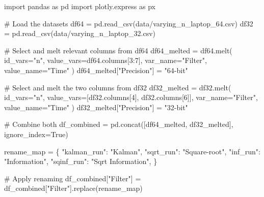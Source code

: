 \documentclass[
]{report}
\newenvironment{Shaded}{\begin{snugshade}}{\end{snugshade}}
\newcommand{\CommentTok}[1]{\textcolor[rgb]{0.37,0.37,0.37}{#1}}
\newcommand{\DecValTok}[1]{\textcolor[rgb]{0.68,0.00,0.00}{#1}}
\newcommand{\ImportTok}[1]{\textcolor[rgb]{0.00,0.46,0.62}{#1}}
\newcommand{\NormalTok}[1]{\textcolor[rgb]{0.00,0.23,0.31}{#1}}
\newcommand{\OperatorTok}[1]{\textcolor[rgb]{0.37,0.37,0.37}{#1}}
\newcommand{\StringTok}[1]{\textcolor[rgb]{0.13,0.47,0.30}{#1}}
\newcommand{\VariableTok}[1]{\textcolor[rgb]{0.07,0.07,0.07}{#1}}
\begin{document}
\begin{Shaded}
\begin{Highlighting}[]
\ImportTok{import}\NormalTok{ pandas }\ImportTok{as}\NormalTok{ pd}
\ImportTok{import}\NormalTok{ plotly.express }\ImportTok{as}\NormalTok{ px}

\CommentTok{\# Load the datasets}
\NormalTok{df64 }\OperatorTok{=}\NormalTok{ pd.read\_csv(}\StringTok{\textquotesingle{}data/varying\_n\_laptop\_64.csv\textquotesingle{}}\NormalTok{)}
\NormalTok{df32 }\OperatorTok{=}\NormalTok{ pd.read\_csv(}\StringTok{\textquotesingle{}data/varying\_n\_laptop\_32.csv\textquotesingle{}}\NormalTok{)}

\CommentTok{\# Select and melt relevant columns from df64}
\NormalTok{df64\_melted }\OperatorTok{=}\NormalTok{ df64.melt(}
\NormalTok{    id\_vars}\OperatorTok{=}\StringTok{"n"}\NormalTok{, }
\NormalTok{    value\_vars}\OperatorTok{=}\NormalTok{df64.columns[}\DecValTok{3}\NormalTok{:}\DecValTok{7}\NormalTok{],}
\NormalTok{    var\_name}\OperatorTok{=}\StringTok{"Filter"}\NormalTok{,}
\NormalTok{    value\_name}\OperatorTok{=}\StringTok{"Time"}
\NormalTok{)}
\NormalTok{df64\_melted[}\StringTok{"Precision"}\NormalTok{] }\OperatorTok{=} \StringTok{"64{-}bit"}

\CommentTok{\# Select and melt the two columns from df32}
\NormalTok{df32\_melted }\OperatorTok{=}\NormalTok{ df32.melt(}
\NormalTok{    id\_vars}\OperatorTok{=}\StringTok{"n"}\NormalTok{,}
\NormalTok{    value\_vars}\OperatorTok{=}\NormalTok{[df32.columns[}\DecValTok{4}\NormalTok{], df32.columns[}\DecValTok{6}\NormalTok{]],}
\NormalTok{    var\_name}\OperatorTok{=}\StringTok{"Filter"}\NormalTok{,}
\NormalTok{    value\_name}\OperatorTok{=}\StringTok{"Time"}
\NormalTok{)}
\NormalTok{df32\_melted[}\StringTok{"Precision"}\NormalTok{] }\OperatorTok{=} \StringTok{"32{-}bit"}

\CommentTok{\# Combine both}
\NormalTok{df\_combined }\OperatorTok{=}\NormalTok{ pd.concat([df64\_melted, df32\_melted], ignore\_index}\OperatorTok{=}\VariableTok{True}\NormalTok{)}

\NormalTok{rename\_map }\OperatorTok{=}\NormalTok{ \{}
    \StringTok{"kalman\_run"}\NormalTok{: }\StringTok{"Kalman"}\NormalTok{,}
    \StringTok{"sqrt\_run"}\NormalTok{: }\StringTok{"Square{-}root"}\NormalTok{,}
    \StringTok{"inf\_run"}\NormalTok{: }\StringTok{"Information"}\NormalTok{,}
    \StringTok{"sqinf\_run"}\NormalTok{: }\StringTok{"Sqrt Information"}\NormalTok{,}
\NormalTok{\}}

\CommentTok{\# Apply renaming}
\NormalTok{df\_combined[}\StringTok{"Filter"}\NormalTok{] }\OperatorTok{=}\NormalTok{ df\_combined[}\StringTok{"Filter"}\NormalTok{].replace(rename\_map)}



\end{Highlighting}
\end{Shaded}
\end{document}
